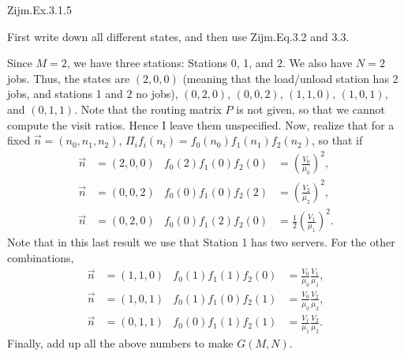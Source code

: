 \begin{exercise}
Zijm.Ex.3.1.5
\begin{hint}
 First write down all  different states, and then use Zijm.Eq.3.2 and 3.3.
\end{hint}
\begin{solution}
  Since $M=2$, we have three stations: Stations 0, 1, and 2. We also
  have $N=2$ jobs. Thus, the states are $(2,0,0)$ (meaning that the
  load/unload station has 2 jobs, and stations 1 and 2 no jobs),
  $(0,2,0)$, $(0,0,2)$, $(1,1,0)$, $(1,0,1)$, and $(0,1,1)$. Note that
  the routing matrix $P$ is not given, so that we cannot compute the
  visit ratios. Hence I leave them unspecified. Now, realize that for
  a fixed $\vec n=(n_0, n_1, n_2)$,
  $\Pi_i f_i(n_i) = f_0(n_0)f_1(n_1)f_2(n_2)$, so that if 
  \begin{align*}
    \vec n &= (2,0,0) & f_0(2)f_1(0)f_2(0) &= \left(\frac{V_0}{\mu_0}\right)^2, \\
    \vec n &= (0,0,2) & f_0(0)f_1(0)f_2(2) &= \left(\frac{V_2}{\mu_2}\right)^2, \\
    \vec n &= (0,2,0) & f_0(0)f_1(2)f_2(0) &= \frac12\left(\frac{V_1}{\mu_1}\right)^2.
  \end{align*}
  Note that in this last result we use that Station 1 has two servers. For the other combinations, 
  \begin{align*}
    \vec n &= (1,1,0) & f_0(1)f_1(1)f_2(0) &= \frac{V_0}{\mu_0}\frac{V_1}{\mu_1}, \\
    \vec n &= (1,0,1) & f_0(1)f_1(0)f_2(1) &= \frac{V_0}{\mu_0}\frac{V_2}{\mu_2}, \\
    \vec n &= (0,1,1) & f_0(0)f_1(1)f_2(1) &= \frac{V_1}{\mu_1}\frac{V_2}{\mu_2}.
  \end{align*}
Finally, add up all the above numbers to make $G(M,N)$. 
\end{solution}
\end{exercise}





